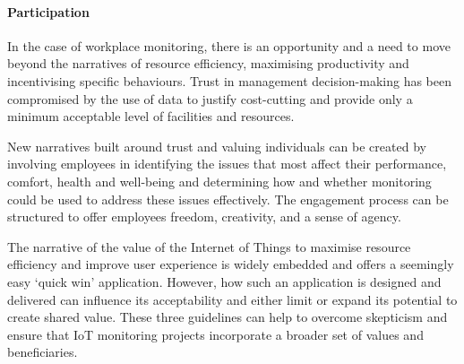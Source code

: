 \paragraph{Participation} In the case of workplace monitoring, there
is an opportunity and a need to move beyond the narratives of resource
efficiency, maximising productivity and incentivising specific
behaviours. Trust in management decision-making has been compromised
by the use of data to justify cost-cutting and provide only a minimum
acceptable level of facilities and resources. 

New narratives built around trust and valuing individuals can be
created by involving employees in identifying the issues that most
affect their performance, comfort, health and well-being and
determining how and whether monitoring could be used to address these
issues effectively. The engagement process can be structured to offer
employees freedom, creativity, and a sense of agency. 

The narrative of the value of the Internet of Things to maximise
resource efficiency and improve user experience is widely embedded and
offers a seemingly easy ‘quick win’ application. However, how such an
application is designed and delivered can influence its acceptability
and either limit or expand its potential to create shared value. These
three guidelines can help to overcome skepticism and ensure that IoT
monitoring projects incorporate a broader set of values and
beneficiaries. 

